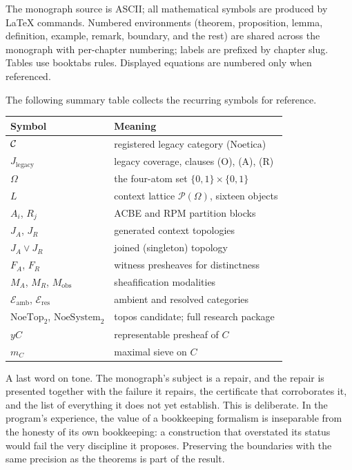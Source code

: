 \begin{notation}\label{ch01:not:typography}
The monograph source is ASCII; all mathematical symbols are produced by
LaTeX commands. Numbered environments (theorem, proposition, lemma,
definition, example, remark, boundary, and the rest) are shared across the
monograph with per-chapter numbering; labels are prefixed by chapter slug.
Tables use booktabs rules. Displayed equations are numbered only when
referenced.
\end{notation}

The following summary table collects the recurring symbols for reference.

\begin{center}
\begin{tabular}{ll}
\toprule
Symbol & Meaning \\
\midrule
$\mathcal{C}$ & registered legacy category ($\mathrm{Noetica}$) \\
$J_{\mathrm{legacy}}$ & legacy coverage, clauses (O), (A), (R) \\
$\Omega$ & the four-atom set $\{0,1\} \times \{0,1\}$ \\
$L$ & context lattice $\mathcal{P}(\Omega)$, sixteen objects \\
$A_i$, $R_j$ & ACBE and RPM partition blocks \\
$J_A$, $J_R$ & generated context topologies \\
$J_A \vee J_R$ & joined (singleton) topology \\
$F_A$, $F_R$ & witness presheaves for distinctness \\
$M_A$, $M_R$, $M_{\mathrm{obs}}$ & sheafification modalities \\
$\mathcal{E}_{\mathrm{amb}}$, $\mathcal{E}_{\mathrm{res}}$ & ambient and resolved categories \\
$\mathrm{NoeTop}_2$, $\mathrm{NoeSystem}_2$ & topos candidate; full research package \\
$yC$ & representable presheaf of $C$ \\
$m_C$ & maximal sieve on $C$ \\
\bottomrule
\end{tabular}
\end{center}

\begin{remark}\label{ch01:rem:tone}
A last word on tone. The monograph's subject is a repair, and the repair is
presented together with the failure it repairs, the certificate that
corroborates it, and the list of everything it does not yet establish. This
is deliberate. In the program's experience, the value of a bookkeeping
formalism is inseparable from the honesty of its own bookkeeping: a
construction that overstated its status would fail the very discipline it
proposes. Preserving the boundaries with the same precision as the theorems
is part of the result.
\end{remark}
